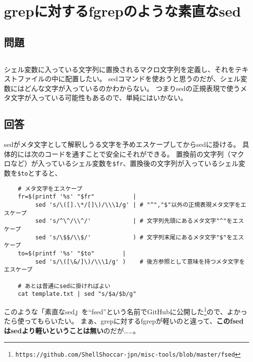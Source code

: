 \section{grepに対するfgrepのような素直なsed}

\subsection*{問題}
\noindent
$\!\!\!\!\!$
\begin{grshfboxit}{160.0mm}
	シェル変数に入っている文字列に置換されるマクロ文字列を定義し、それをテキストファイルの中に配置したい。
	sedコマンドを使おうと思うのだが、シェル変数にはどんな文字が入っているのかわからない。
	つまりsedの正規表現で使うメタ文字が入っている可能性もあるので、単純にはいかない。
\end{grshfboxit}

\subsection*{回答}
sedがメタ文字として解釈しうる文字を予めエスケープしてからsedに掛ける。
具体的には次のコードを通すことで安全にそれができる。
置換前の文字列（マクロなど）が入っているシェル変数を\verb|$fr|、置換後の文字列が入っているシェル変数を\verb|$to|とすると、

\noindent
\begin{frameboxit}{160.0mm}
\begin{verbatim}
	# メタ文字をエスケープ
	fr=$(printf '%s' "$fr"           |
	     sed 's/\([].\*/[]\)/\\\1/g' | # "^","$"以外の正規表現メタ文字をエスケープ
	     sed 's/^\^/\\^/'            | # 文字列先頭にあるメタ文字"^"をエスケープ
	     sed 's/\$$/\\$/'            ) # 文字列末尾にあるメタ文字"$"をエスケープ
	to=$(printf '%s' "$to"        |
	     sed 's/\([\&/]\)/\\\1/g' )    # 後方参照として意味を持つメタ文字をエスケープ

	# あとは普通にsedに掛ければよい
	cat template.txt | sed "s/$a/$b/g"
\end{verbatim}
\end{frameboxit}

このような「素直なsed」を``fsed''という名前でGitHubに公開した\footnote{\verb|https://github.com/ShellShoccar-jpn/misc-tools/blob/master/fsed|}ので、よかったら使ってもらいたい。
まぁ、grepに対するfgrepが軽いのと違って、\textbf{このfsedはsedより軽いということは無い}のだが……。

